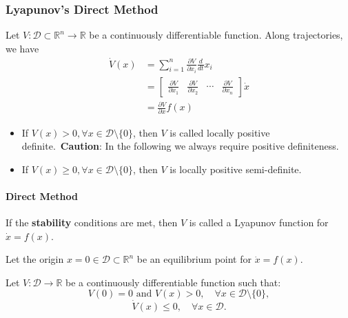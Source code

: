 \subsubsection{Lyapunov's Direct Method}

\newpar{}

Let $V: \mathcal{D} \subset \mathbb{R}^n \to \mathbb{R}$ be a continuously differentiable function. Along trajectories, we have
\begin{align*}
    \dot{V} (x) & =\sum_{i=1}^n\frac{\partial V}{\partial x_i}\frac{d}{dt}x_i                                                   \\
                & =\begin{bmatrix}
                       \frac{\partial V}{\partial x_1} & \frac{\partial V}{\partial x_2} & \cdots & \frac{\partial V}{\partial x_n}
                   \end{bmatrix}\dot{x} \\
                & = \frac{\partial V}{\partial x} f(x)
\end{align*}

\newpar{}

\begin{itemize}
    \item If $V (x) > 0, \forall x \in \mathcal{D}\setminus \{0\}$, then $V$ is called locally positive definite.~\textbf{Caution}: In the following we always require positive definiteness.
    \item If $V (x) \geq 0, \forall x \in \mathcal{D}\setminus \{0\}$, then $V$ is locally positive semi-definite.
\end{itemize}

\paragraph{Direct Method}
If the \textbf{stability} conditions are met, then $V$ is called a Lyapunov function for $\dot{x} = f (x)$.

\newpar{}

Let the origin $x = 0 \in \mathcal{D} \subset \mathbb{R}^n$ be an equilibrium point for $\dot{x} = f (x)$.

Let $V : \mathcal{D} \to \mathbb{R}$ be a continuously differentiable function such that:
\begin{equation*}
    V (0) = 0 \text{ and } V (x) > 0, \quad \forall x \in \mathcal{D} \setminus \{0\},
\end{equation*}
\begin{equation*}
    \dot{V} (x) \leq 0, \quad \forall x \in \mathcal{D}.
\end{equation*}

